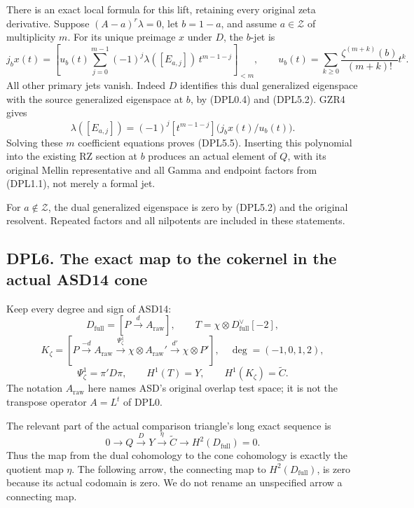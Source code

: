 There is an exact local formula for this lift, retaining every original
zeta derivative. Suppose \((A-a)^r\lambda=0\), let \(b=1-a\), and assume
\(a\in\mathscr Z\) of multiplicity \(m\). For its unique preimage \(x\)
under \(D\), the \(b\)-jet is \[
j_bx(t)=
\left[
u_b(t)\sum_{j=0}^{m-1}(-1)^j
\lambda([E_{a,j}])\,t^{m-1-j}
\right]_{<m},
\qquad
u_b(t)=\sum_{k\ge0}\frac{\zeta^{(m+k)}(b)}{(m+k)!}t^k.
\tag{DPL5.5}
\] All other primary jets vanish. Indeed \(D\) identifies this dual
generalized eigenspace with the source generalized eigenspace at \(b\),
by (DPL0.4) and (DPL5.2). GZR4 gives \[
\lambda([E_{a,j}])
=(-1)^j[t^{m-1-j}]\bigl(j_bx(t)/u_b(t)\bigr).
\] Solving these \(m\) coefficient equations proves (DPL5.5). Inserting
this polynomial into the existing RZ section at \(b\) produces an actual
element of \(Q\), with its original Mellin representative and all Gamma
and endpoint factors from (DPL1.1), not merely a formal jet.

For \(a\notin\mathscr Z\), the dual generalized eigenspace is zero by
(DPL5.2) and the original resolvent. Repeated factors and all nilpotents
are included in these statements.

\subsection{DPL6. The exact map to the cokernel in the actual ASD14
cone}\label{dpl6.-the-exact-map-to-the-cokernel-in-the-actual-asd14-cone}

Keep every degree and sign of ASD14: \[
D_{\mathrm{full}}=[P\xrightarrow d A_{\mathrm{raw}}],
\qquad
T=\chi\otimes D_{\mathrm{full}}^\vee[-2],
\] \[
K_\zeta=
\left[
P\xrightarrow{-d}A_{\mathrm{raw}}
\xrightarrow{\Psi_\zeta^1}\chi\otimes A_{\mathrm{raw}}'
\xrightarrow{d'}\chi\otimes P'
\right],
\quad\deg=(-1,0,1,2),
\] \[
\Psi_\zeta^1=\pi'D\pi,\qquad
H^1(T)=Y,\qquad H^1(K_\zeta)=\widetilde C.
\tag{DPL6.1}
\] The notation \(A_{\mathrm{raw}}\) here names ASD's original overlap
test space; it is not the transpose operator \(A=L^t\) of DPL0.

The relevant part of the actual comparison triangle's long exact
sequence is \[
0\longrightarrow Q\xrightarrow D Y
\xrightarrow{\eta}\widetilde C
\longrightarrow H^2(D_{\mathrm{full}})=0.
\tag{DPL6.2}
\] Thus the map from the dual cohomology to the cone cohomology is
exactly the quotient map \(\eta\). The following arrow, the connecting
map to \(H^2(D_{\mathrm{full}})\), is zero because its actual codomain
is zero. We do not rename an unspecified arrow a connecting map.


